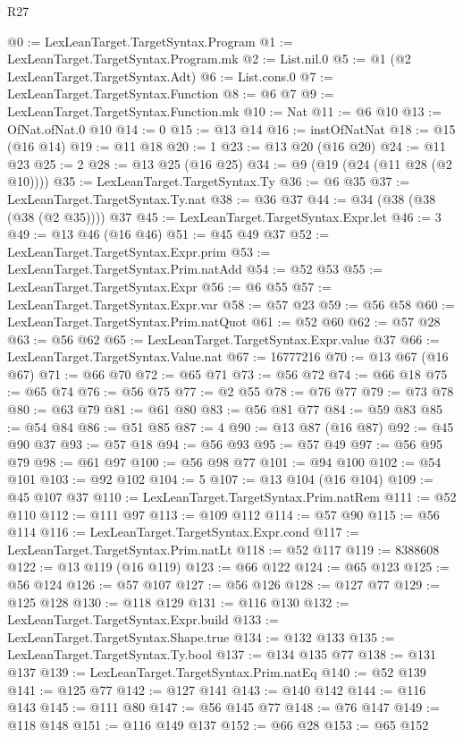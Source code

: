 \begin{lexlean}{R27}
\begin{coremodule}
@0 := LexLeanTarget.TargetSyntax.Program
@1 := LexLeanTarget.TargetSyntax.Program.mk
@2 := List.nil.{0}
@5 := @1 (@2 LexLeanTarget.TargetSyntax.Adt)
@6 := List.cons.{0}
@7 := LexLeanTarget.TargetSyntax.Function
@8 := @6 @7
@9 := LexLeanTarget.TargetSyntax.Function.mk
@10 := Nat
@11 := @6 @10
@13 := OfNat.ofNat.{0} @10
@14 := 0
@15 := @13 @14
@16 := instOfNatNat
@18 := @15 (@16 @14)
@19 := @11 @18
@20 := 1
@23 := @13 @20 (@16 @20)
@24 := @11 @23
@25 := 2
@28 := @13 @25 (@16 @25)
@34 := @9 (@19 (@24 (@11 @28 (@2 @10))))
@35 := LexLeanTarget.TargetSyntax.Ty
@36 := @6 @35
@37 := LexLeanTarget.TargetSyntax.Ty.nat
@38 := @36 @37
@44 := @34 (@38 (@38 (@38 (@2 @35)))) @37
@45 := LexLeanTarget.TargetSyntax.Expr.let
@46 := 3
@49 := @13 @46 (@16 @46)
@51 := @45 @49 @37
@52 := LexLeanTarget.TargetSyntax.Expr.prim
@53 := LexLeanTarget.TargetSyntax.Prim.natAdd
@54 := @52 @53
@55 := LexLeanTarget.TargetSyntax.Expr
@56 := @6 @55
@57 := LexLeanTarget.TargetSyntax.Expr.var
@58 := @57 @23
@59 := @56 @58
@60 := LexLeanTarget.TargetSyntax.Prim.natQuot
@61 := @52 @60
@62 := @57 @28
@63 := @56 @62
@65 := LexLeanTarget.TargetSyntax.Expr.value @37
@66 := LexLeanTarget.TargetSyntax.Value.nat
@67 := 16777216
@70 := @13 @67 (@16 @67)
@71 := @66 @70
@72 := @65 @71
@73 := @56 @72
@74 := @66 @18
@75 := @65 @74
@76 := @56 @75
@77 := @2 @55
@78 := @76 @77
@79 := @73 @78
@80 := @63 @79
@81 := @61 @80
@83 := @56 @81 @77
@84 := @59 @83
@85 := @54 @84
@86 := @51 @85
@87 := 4
@90 := @13 @87 (@16 @87)
@92 := @45 @90 @37
@93 := @57 @18
@94 := @56 @93
@95 := @57 @49
@97 := @56 @95 @79
@98 := @61 @97
@100 := @56 @98 @77
@101 := @94 @100
@102 := @54 @101
@103 := @92 @102
@104 := 5
@107 := @13 @104 (@16 @104)
@109 := @45 @107 @37
@110 := LexLeanTarget.TargetSyntax.Prim.natRem
@111 := @52 @110
@112 := @111 @97
@113 := @109 @112
@114 := @57 @90
@115 := @56 @114
@116 := LexLeanTarget.TargetSyntax.Expr.cond
@117 := LexLeanTarget.TargetSyntax.Prim.natLt
@118 := @52 @117
@119 := 8388608
@122 := @13 @119 (@16 @119)
@123 := @66 @122
@124 := @65 @123
@125 := @56 @124
@126 := @57 @107
@127 := @56 @126
@128 := @127 @77
@129 := @125 @128
@130 := @118 @129
@131 := @116 @130
@132 := LexLeanTarget.TargetSyntax.Expr.build
@133 := LexLeanTarget.TargetSyntax.Shape.true
@134 := @132 @133
@135 := LexLeanTarget.TargetSyntax.Ty.bool
@137 := @134 @135 @77
@138 := @131 @137
@139 := LexLeanTarget.TargetSyntax.Prim.natEq
@140 := @52 @139
@141 := @125 @77
@142 := @127 @141
@143 := @140 @142
@144 := @116 @143
@145 := @111 @80
@147 := @56 @145 @77
@148 := @76 @147
@149 := @118 @148
@151 := @116 @149 @137
@152 := @66 @28
@153 := @65 @152

\end{coremodule}
\end{lexlean}
